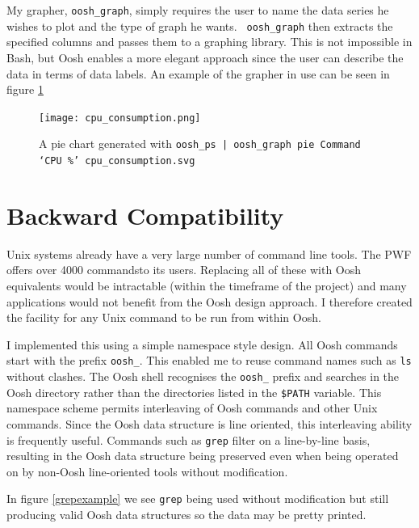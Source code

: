 \documentclass[12pt,twoside,notitlepage]{report}
\begin{document}
My grapher, {\tt oosh\_graph}, simply requires the user to name the
data series he wishes to plot and the type of graph he wants. {\tt
  oosh\_graph} then extracts the specified columns and passes them to
a graphing library. This is not impossible in Bash, but Oosh enables a
more elegant approach since the user can describe the data in terms of
data labels. An example of the grapher in use can be seen in figure
\ref{piegraph}

\begin{figure}[h]
  \centering
  \texttt{[image: cpu\_consumption.png]}
  \caption{A pie chart generated with {\tt oosh\_ps | oosh\_graph pie
      Command `CPU \%' cpu\_consumption.svg}}
  \label{piegraph}
\end{figure}

\section{Backward Compatibility}

Unix systems already have a very large number of command line
tools. The PWF offers over 4000 commands\footnotemark[3] to its users. Replacing all
of these with Oosh equivalents would be intractable (within the
timeframe of the project) and many applications would not benefit from
the Oosh design approach. I therefore created the facility for any
Unix command to be run from within Oosh.


I implemented this using a simple namespace style design. All Oosh
commands start with the prefix {\tt oosh\_}. This enabled me to reuse
command names such as {\tt ls} without clashes. The Oosh shell
recognises the {\tt oosh\_} prefix and searches in the Oosh directory
rather than the directories listed in the {\tt \$PATH} variable. This
namespace scheme permits interleaving of Oosh commands and other Unix
commands. Since the Oosh data structure is line oriented, this
interleaving ability is frequently useful. Commands such as {\tt grep}
filter on a line-by-line basis, resulting in the Oosh data structure
being preserved even when being operated on by non-Oosh line-oriented
tools without modification.

In figure \ref{grepexample} we see {\tt grep} being used without
modification but still producing valid Oosh data structures so the
data may be pretty printed.
\end{document}
